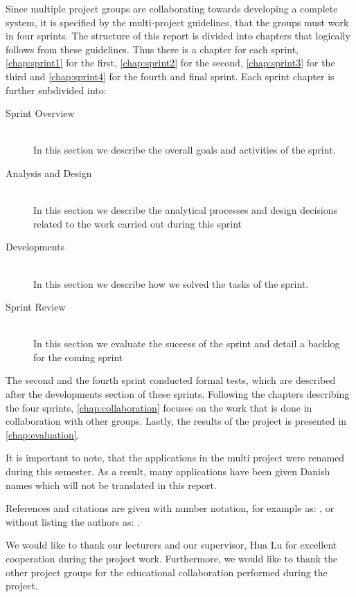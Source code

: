 Since multiple project groups are collaborating towards developing a complete system, it is specified by the multi-project guidelines, that the groups must work in four sprints.
The structure of this report is divided into chapters that logically follows from these guidelines.
Thus there is a chapter for each sprint, \cref{chap:sprint1} for the first, \cref{chap:sprint2} for the second, \cref{chap:sprint3} for the third and \cref{chap:sprint4} for the fourth and final sprint.
Each sprint chapter is further subdivided into:

\begin{description}
\item[Sprint Overview] \hfill \\
In this section we describe the overall goals and activities of the sprint.
\item[Analysis and Design] \hfill \\
In this section we describe the analytical processes and design decisions related to the work carried out during this sprint
\item[Developments] \hfill \\
In this section we describe how we solved the tasks of the sprint.
\item[Sprint Review] \hfill \\
In this section we evaluate the success of the sprint and detail a backlog for the coming sprint
\end{description}

The second and the fourth sprint conducted formal tests, which are described after the developments section of these sprints.
Following the chapters describing the four sprints, \cref{chap:collaboration} focuses on the work that is done in collaboration with other groups.
Lastly, the results of the project is presented in \cref{chap:evaluation}.

It is important to note, that the applications in the multi project were renamed during this semester.
As a result, many applications have been given Danish names which will not be translated in this report.

References and citations are given with number notation, for example as: \citet{launcher2011}, or without listing the authors as: \cite{launcher2011}. 

We would like to thank our lecturers and our supervisor, Hua Lu for excellent cooperation during the project work.
Furthermore, we would like to thank the other project groups for the educational collaboration performed during the project.
